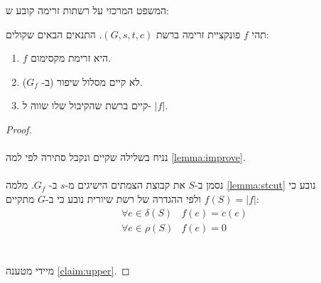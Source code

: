 המשפט המרכזי על רשתות זרימה קובע ש:
\begin{theorem}
\label{theorem:mincutmaxflow}
תהי $f$ פונקציית זרימה ברשת
$(G, s, t, c)$.
התנאים הבאים שקולים:
\begin{enumerate}
\item
$f$
היא זרימת מקסימום.
\item
לא קיים מסלול שיפור (ב-%
$G_f$).
\item
קיים 
\stcut{}
ברשת שהקיבול שלו שווה ל-%
$|f|$.
\end{enumerate}
\end{theorem}

\begin{proof}
$ $
\\
\\
נניח בשלילה שקיים ונקבל סתירה לפי למה
\ref{lemma:improve}.
\\
\\
נסמן ב-$S$ את קבוצת הצמתים הישיגים מ-$s$ ב-%
$G_f$.
מלמה
\ref{lemma:stcut}
נובע כי
$f(S) = |f|$
ולפי ההגדרה של רשת שיורית נובע כי ב-$G$ מתקיים:
$$
\begin{array}{ll}
\forall e \in \delta(S) & f(e) = c(e)
\\
\forall e \in \rho(S) & f(e) = 0
\end{array}
$$
\\
\\
מיידי מטענה 
\ref{claim:upper}.
\end{proof}

